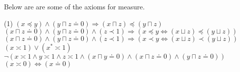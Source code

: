 \documentclass{article}
\newcommand{\lcup}{\sqcup}
\newcommand{\lcap}{\sqcap}
\newcommand{\lstar}{^*}
\newcommand{\lparteq}{\doteq}
\newcommand{\lcont}{C}
\newcommand{\lmeasure}{\preceq}
\newcommand{\lmeasures}{\prec}
\newcommand{\lmeasureeq}{\asymp}
\begin{document}
Below are are some of the axioms for measure.
\begin{tasks}(1)
  \task[] $(x \lmeasure y) \land (y \lcap z \lparteq 0) \Rightarrow (x \lcap z) \lmeasure (y \lcap z)$
  \task[] $(x \lcap z \lparteq 0) \land (y \lcap z \lparteq 0) \land (z \lmeasures 1) \Rightarrow (x \lmeasure y \Leftrightarrow (x \lcup z) \lmeasure (y \lcup z))$
  \task[] $(x \lcap z \lparteq 0) \land (y \lcap z \lparteq 0) \land (z \lmeasures 1) \Rightarrow (x \lmeasures y \Leftrightarrow (x \lcup z) \lmeasures (y \lcup z))$
  \task[] $(x \lmeasureeq 1) \lor (x\lstar \lmeasureeq 1)$
  \task[] $\lnot(x \lmeasureeq 1 \land y \lmeasureeq 1 \land z \lmeasureeq 1 \land (x \lcap y \lparteq 0) \land (x \lcap z \lparteq 0) \land (y \lcap z \lparteq 0))$
  \task[] $(x \lmeasureeq 0) \Leftrightarrow (x \lparteq 0)$
\end{tasks}

\end{document}
